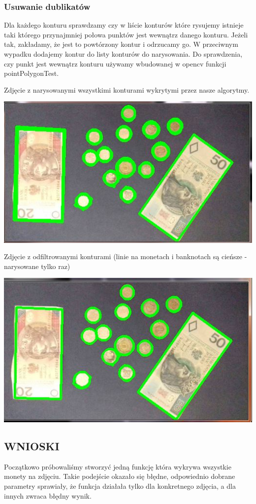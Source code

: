 \documentclass[12pt]{article}
\begin{document}
\newpage
\subsubsection*{Usuwanie dublikatów}
Dla każdego konturu sprawdzamy czy w liście konturów które rysujemy istnieje taki którego przynajmniej połowa punktów jest wewnątrz danego konturu. Jeżeli tak, zakładamy, że jest to powtórzony kontur i odrzucamy go. W przeciwnym wypadku dodajemy kontur do listy konturów do narysowania.
Do sprawdzenia, czy punkt jest wewnątrz konturu używamy wbudowanej w opencv funkcji pointPolygonTest.

Zdjęcie z narysowanymi wszystkimi konturami wykrytymi przez nasze algorytmy.

\includegraphics[scale=0.8]{wszystkie}

Zdjęcie z odfiltrowanymi konturami (linie na monetach i banknotach są cieńsze - narysowane tylko raz)

\includegraphics[scale=0.8]{filtrowane}

\newpage
\subsection*{WNIOSKI}
Początkowo próbowaliśmy stworzyć jedną funkcję która wykrywa wszystkie monety na zdjęciu. Takie podejście okazało się błędne, odpowiednio dobrane parametry sprawiały, że funkcja działała tylko dla konkretnego zdjęcia, a dla innych zwraca błędny wynik. 
\end{document}
